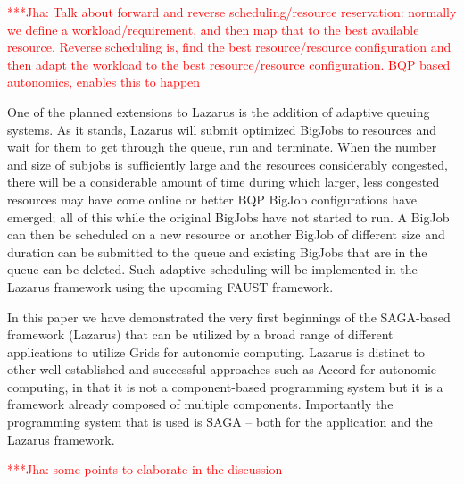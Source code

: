 \documentclass[conference,final]{IEEEtran}
\newcommand{\jhanote}[1]{ {\textcolor{red} { ***Jha: #1 }}}
\newcommand{\yyenote}[1]{ {\textcolor{blue} { ***yye00: #1 }}}
\newcommand{\jhanote}[1]{}
\newcommand{\yyenote}[1]{}
\begin{document}
\jhanote{Talk about forward and reverse scheduling/resource
  reservation: normally we define a workload/requirement, and then map
  that to the best available resource. Reverse scheduling is, find the
  best resource/resource configuration and then adapt the workload to
  the best resource/resource configuration. BQP based autonomics,
  enables this to happen}



One of the planned extensions to Lazarus is the addition of adaptive
queuing systems. As it stands, Lazarus will submit optimized BigJobs
to resources and wait for them to get through the queue, run and
terminate.  When the number and size of subjobs is sufficiently large
and the resources considerably congested, there will be a considerable
amount of time during which larger, less congested resources may have
come online or better BQP BigJob configurations have emerged; all of
this while the original BigJobs have not started to run. A BigJob can
then be scheduled on a new resource or another BigJob of different
size and duration can be submitted to the queue and existing BigJobs
that are in the queue can be deleted.  Such adaptive scheduling will
be implemented in the Lazarus framework using the upcoming FAUST
framework.


In this paper we have demonstrated the very first beginnings of the
SAGA-based framework (Lazarus) that can be utilized by a broad range
of different applications to utilize Grids for autonomic computing.
Lazarus is distinct to other well established and successful
approaches such as Accord for autonomic computing, in that it is not a
component-based programming system but it is a framework already
composed of multiple components. Importantly the programming system
that is used is SAGA -- both for the application and the Lazarus
framework.

\jhanote{some points to elaborate in the discussion}
\end{document}
